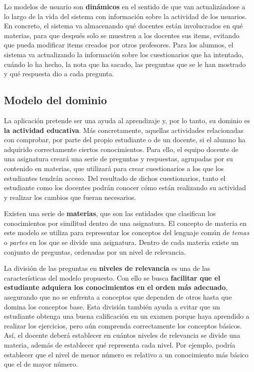 Lo modelos de usuario son \textbf{dinámicos} en el sentido de que van  actualizándose a lo largo de la vida del sistema con información sobre la actividad de los usuarios. En concreto, el sistema va almacenando qué docentes están involucrados en qué materias, para que después solo se muestren a los docentes sus items, evitando que pueda modificar items creados por otros profesores. Para los alumnos, el sistema va actualizando la información sobre los cuestionarios que ha intentado, cuándo lo ha hecho, la nota que ha sacado, las preguntas que se le han mostrado y qué respuesta dio a cada pregunta.

\subsection{Modelo del dominio}

La aplicación pretende ser una ayuda al aprendizaje y, por lo tanto, su dominio es \textbf{la actividad educativa}. Más concretamente, aquellas actividades relacionadas con comprobar, por parte del propio estudiante o de un docente, si el alumno ha adquirido correctamente ciertos conocimientos. Para ello, el equipo docente de una asignatura creará una serie de preguntas y respuestas, agrupadas por su contenido en materias, que utilizará para crear cuestionarios a los que los estudiantes tendrán acceso. Del resultado de dichos cuestionarios, tanto el estudiante como los docentes podrán conocer cómo están realizando su actividad y realizar los cambios que fueran necesarios.

Existen una serie de \textbf{materias}, que son las entidades que clasifican los conocimientos por similitud dentro de una asignatura. El concepto de materia en este modelo se utiliza para representar los conceptos del lenguaje común de \emph{temas} o \emph{partes} en los que se divide una asignatura. Dentro de cada materia existe un conjunto de preguntas, ordenadas por un nivel de relevancia.

La división de las preguntas en \textbf{niveles de relevancia} es una de las características del modelo propuesto. Con ello se busca \textbf{facilitar que el estudiante adquiera los conocimientos en el orden más adecuado}, asegurando que no se enfrenta a conceptos que dependen de otros hasta que domina los conceptos base. Esta división también ayuda a evitar que un estudiante obtenga una buena calificación en un examen porque haya aprendido a realizar los ejercicios, pero aún comprenda correctamente los conceptos básicos. Así, el docente deberá establecer en cuántos niveles de relevancia se divide una materia, además de establecer qué representa cada nivel. Por ejemplo, podría establecer que el nivel de menor número es relativo a un conocimiento más básico que el de mayor número.

